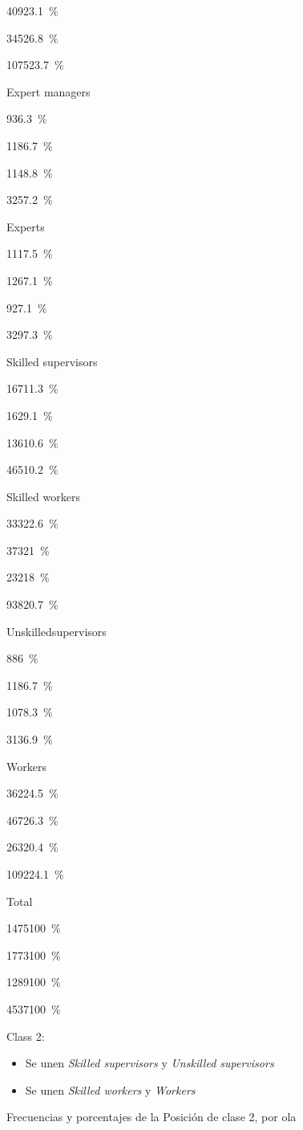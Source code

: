 \documentclass[
  12pt,
]{book}
\providecommand{\tightlist}{%
  \setlength{\itemsep}{0pt}\setlength{\parskip}{0pt}}
\begin{document}
{409}{23.1~\%}

{345}{26.8~\%}

{1075}{23.7~\%}

Expert managers

{93}{6.3~\%}

{118}{6.7~\%}

{114}{8.8~\%}

{325}{7.2~\%}

Experts

{111}{7.5~\%}

{126}{7.1~\%}

{92}{7.1~\%}

{329}{7.3~\%}

Skilled supervisors

{167}{11.3~\%}

{162}{9.1~\%}

{136}{10.6~\%}

{465}{10.2~\%}

Skilled workers

{333}{22.6~\%}

{373}{21~\%}

{232}{18~\%}

{938}{20.7~\%}

Unskilledsupervisors

{88}{6~\%}

{118}{6.7~\%}

{107}{8.3~\%}

{313}{6.9~\%}

Workers

{362}{24.5~\%}

{467}{26.3~\%}

{263}{20.4~\%}

{1092}{24.1~\%}

Total

{1475}{100~\%}

{1773}{100~\%}

{1289}{100~\%}

{4537}{100~\%}

Class 2:

\begin{itemize}
\tightlist
\item
  Se unen \emph{Skilled supervisors} y \emph{Unskilled supervisors}
\item
  Se unen \emph{Skilled workers} y \emph{Workers}
\end{itemize}

Frecuencias y porcentajes de la Posición de clase 2, por ola
\end{document}
